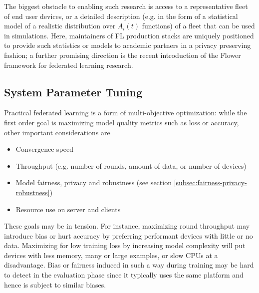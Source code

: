 \documentclass[11pt]{article}
\begin{document}
The biggest obstacle to enabling such research is access to a representative fleet of end user devices, or a detailed description (e.g. in the form of a statistical model of a realistic distribution over $A_i(t)$ functions) of a fleet that can be used in simulations. Here, maintainers of FL production stacks are uniquely positioned to provide such statistics or models to academic partners in a privacy preserving fashion; a further promising direction is the recent introduction of the Flower framework \citep{beutel2020flower} for federated learning research.

\subsection{System Parameter Tuning}
\label{subsec:systems-system-parameter-tuning}
Practical federated learning is a form of multi-objective optimization: while the first order goal is maximizing model quality metrics such as loss or accuracy, other important considerations are
\begin{itemize}
    \item Convergence speed
    \item Throughput (e.g. number of rounds, amount of data, or number of devices)
    \item Model fairness, privacy and robustness (see section \ref{subsec:fairness-privacy-robustness})
    \item Resource use on server and clients
\end{itemize}

These goals may be in tension. For instance, maximizing round throughput may introduce bias or hurt accuracy by preferring performant devices with little or no data. Maximizing for low training loss by increasing model complexity will put devices with less memory, many or large examples, or slow CPUs at a disadvantage. Bias or fairness induced in such a way during training may be hard to detect in the evaluation phase since it typically uses the same platform and hence is subject to similar biases.
\end{document}
